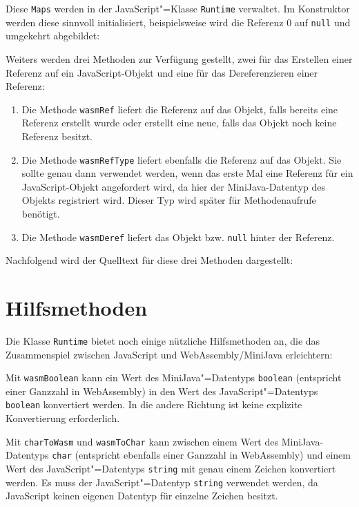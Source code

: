Diese \lstinline{Maps} werden in der JavaScript"=Klasse \lstinline{Runtime} verwaltet. Im Konstruktor werden diese sinnvoll initialisiert, beispielsweise wird die Referenz 0 auf \lstinline{null} und umgekehrt abgebildet:



Weiters werden drei Methoden zur Verfügung gestellt, zwei für das Erstellen einer Referenz auf ein JavaScript-Objekt und eine für das Dereferenzieren einer Referenz:
\begin{enumerate}
    \item Die Methode \lstinline{wasmRef} liefert die Referenz auf das Objekt, falls bereits eine Referenz erstellt wurde oder erstellt eine neue, falls das Objekt noch keine Referenz besitzt.
    \item Die Methode \lstinline{wasmRefType} liefert ebenfalls die Referenz auf das Objekt. Sie sollte genau dann verwendet werden, wenn das erste Mal eine Referenz für ein Ja\-va\-Script-Ob\-jekt angefordert wird, da hier der MiniJava-Datentyp des Objekts registriert wird. Dieser Typ wird später für Methodenaufrufe benötigt.
    \item Die Methode \lstinline{wasmDeref} liefert das Objekt bzw. \lstinline{null} hinter der Referenz.
\end{enumerate}

Nachfolgend wird der Quelltext für diese drei Methoden dargestellt:



\section{Hilfsmethoden}

Die Klasse \lstinline{Runtime} bietet noch einige nützliche Hilfsmethoden an, die das Zusammenspiel zwischen JavaScript und WebAssembly/MiniJava erleichtern:



Mit \lstinline{wasmBoolean} kann ein Wert des MiniJava"=Datentyps \lstinline{boolean} (entspricht einer Ganzzahl in WebAssembly) in den Wert des JavaScript"=Datentyps \lstinline{boolean} konvertiert werden. In die andere Richtung ist keine explizite Konvertierung erforderlich.

Mit \lstinline{charToWasm} und \lstinline{wasmToChar} kann zwischen einem Wert des MiniJava-Datentyps \lstinline{char} (entspricht ebenfalls einer Ganzzahl in WebAssembly) und einem Wert des JavaScript"=Datentyps \lstinline{string} mit genau einem Zeichen konvertiert werden.
Es muss der JavaScript"=Datentyp \lstinline{string} verwendet werden, da JavaScript keinen eigenen Datentyp für einzelne Zeichen besitzt.

